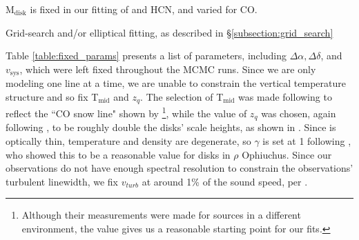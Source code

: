 \begin{table}[h!]
\begin{threeparttable}
    \begin{tablenotes}\footnotesize
      \item[*] M$_\text{disk}$ is fixed in our fitting of \hco and HCN, and varied for CO.
      \item[0] Grid-search and/or elliptical fitting, as described in \S\ref{subsection:grid_search}
      \item[1] \citet{Williams2014}
      \item[2] \citet{Flaherty2015}
      \item[3] \citet{GaiaCollaboration2018}
      \item[4] \citet{Andrews2009}
      \item[5] \citet{Factor2017}
      \item[6] \citet{Qi2011}
    \end{tablenotes}
  \end{threeparttable}
\end{table}

Table \ref{table:fixed_params} presents a list of parameters, including $\Delta \alpha, \Delta \delta$, and $v_\text{sys}$, which were left fixed throughout the MCMC runs. Since we are only modeling one line at a time, we are unable to constrain the vertical temperature structure and so fix T$_\text{mid}$ and $z_q$. The selection of T$_\text{mid}$ was made following \citet{Factor2017} to reflect the ``CO snow line" shown by \citet{Qi2011}\footnote{Although their measurements were made for sources in a different environment, the value gives us a reasonable starting point for our fits.}, while the value of $z_q$ was chosen, again following \citet{Factor2017}, to be roughly double the disks' scale heights, as shown in \citet{Rosenfeld2013}. Since \hco is optically thin, temperature and density are degenerate, so $\gamma$ is set at 1 following \cite{Andrews2009}, who showed this to be a reasonable value for disks in $\rho$ Ophiuchus. Since our observations do not have enough spectral resolution to constrain the observations' turbulent linewidth, we fix $v_{turb}$ at around 1\% of the sound speed, per \citet{Flaherty2015}.



